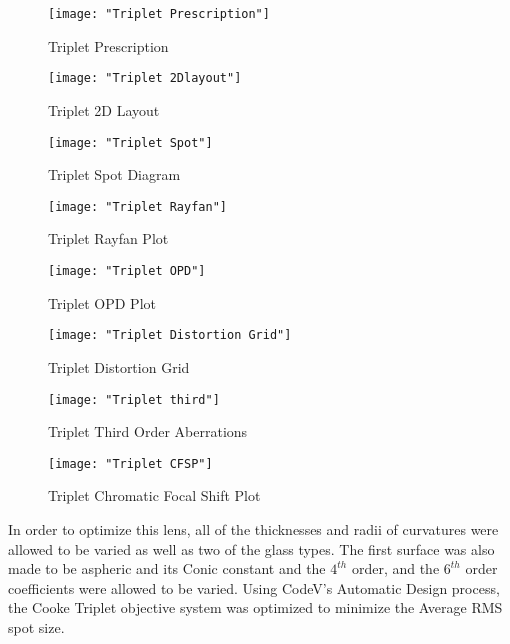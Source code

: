 \documentclass{article}
\begin{document}
\begin{figure}[H]
	\texttt{[image: "Triplet Prescription"]}
	\centering
	\caption{Triplet Prescription}
	\centering
\end{figure}

\begin{figure}[H]
	\texttt{[image: "Triplet 2Dlayout"]}
	\centering
	\caption{Triplet 2D Layout}
	\centering
\end{figure}

\begin{figure}[H]
	\texttt{[image: "Triplet Spot"]}
	\centering
	\caption{Triplet Spot Diagram}
	\centering
\end{figure}

\begin{figure}[H]
	\texttt{[image: "Triplet Rayfan"]}
	\centering
	\caption{Triplet Rayfan Plot}
	\centering
\end{figure}

\begin{figure}[H]
	\texttt{[image: "Triplet OPD"]}
	\centering
	\caption{Triplet OPD Plot}
	\centering
\end{figure}

\begin{figure}[H]
	\texttt{[image: "Triplet Distortion Grid"]}
	\centering
	\caption{Triplet Distortion Grid}
	\centering
\end{figure}

\begin{figure}[H]
	\texttt{[image: "Triplet third"]}
	\centering
	\caption{Triplet Third Order Aberrations}
	\centering
\end{figure}

\begin{figure}[H]
	\texttt{[image: "Triplet CFSP"]}
	\centering
	\caption{Triplet Chromatic Focal Shift Plot}
	\centering
\end{figure}

\newpage

In order to optimize this lens, all of the thicknesses and radii of curvatures were allowed to be varied as well as two of the glass types. The first surface was also made to be aspheric and its Conic constant and the $4^{th}$ order, and the $6^{th}$ order coefficients were allowed to be varied. Using CodeV's Automatic Design process, the Cooke Triplet objective system was optimized to minimize the Average RMS spot size. \\
\end{document}
